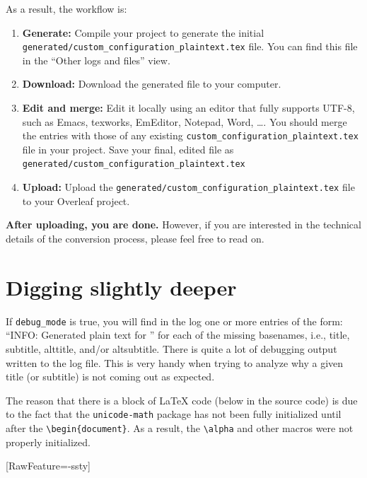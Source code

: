 \documentclass{article}
\begin{document}
As a result, the workflow is:
\begin{enumerate}
    \item \textbf{Generate:} Compile your project to generate the initial \texttt{generated/custom\_configuration\_plaintext.tex} file. You can find this file in the ``Other logs and files'' view.
    \item \textbf{Download:} Download the generated file to your computer.
    \item \textbf{Edit and merge:} Edit it locally using an editor that fully supports UTF-8, such as Emacs, texworks, EmEditor, Notepad, Word, \ldots . You should merge the entries with those of any existing \texttt{custom\_configuration\_plaintext.tex} file in your project. Save your final, edited file as \texttt{generated/custom\_configuration\_plaintext.tex}
    \item \textbf{Upload:} Upload the \texttt{generated/custom\_configuration\_plaintext.tex} file to your Overleaf project.
\end{enumerate}

\textbf{After uploading, you are done.} However, if you are interested in the technical details of the conversion process, please feel free to read on.

\section{Digging slightly deeper}
\label{sec:diggingDeeper}

If \texttt{debug\_mode} is true, you will find in the log one or more entries of the form: ``INFO: Generated plain text for '' for each of the missing basenames, i.e., title, subtitle, alttitle, and/or altsubtitle.  There is quite a lot of debugging output written to the log file. This is very handy when trying to analyze why a given title (or subtitle) is not coming out as expected. 

The reason that there is a block of \LaTeX{} code (below in the source code) is due to the fact that the \texttt{unicode-math} package has not been fully initialized until after the \texttt{\textbackslash begin\{document\}}. As a result, the \texttt{\textbackslash alpha} and other macros were not properly initialized. 

\begingroup
    \NoLigaturesFont %
    [RawFeature={-ssty}]
\makeatletter
\let\@title\@empty
\newcommand{\title}[1]{\def\@title{#1}}
\makeatother
\newcommand{\date}[1]{}
\end{document}
